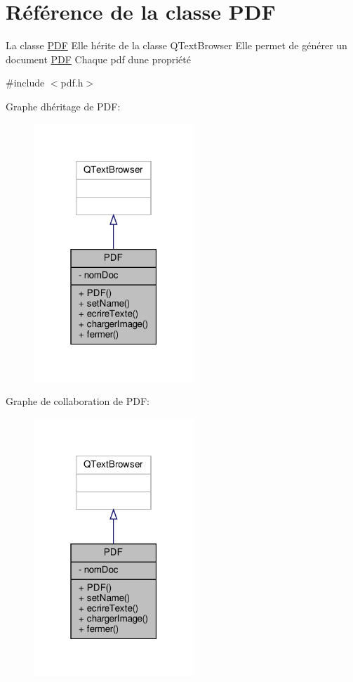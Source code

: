 \hypertarget{class_p_d_f}{}\section{Référence de la classe P\+DF}
\label{class_p_d_f}


La classe \hyperlink{class_p_d_f}{P\+DF} Elle hérite de la classe Q\+Text\+Browser Elle permet de générer un document \hyperlink{class_p_d_f}{P\+DF} Chaque pdf d\textquotesingle{}une propriété  




{\ttfamily \#include $<$pdf.\+h$>$}



Graphe d\textquotesingle{}héritage de P\+DF\+:\nopagebreak
\begin{figure}[H]
\begin{center}
\leavevmode
\includegraphics[width=171pt]{class_p_d_f__inherit__graph}
\end{center}
\end{figure}


Graphe de collaboration de P\+DF\+:\nopagebreak
\begin{figure}[H]
\begin{center}
\leavevmode
\includegraphics[width=171pt]{class_p_d_f__coll__graph}
\end{center}
\end{figure}
